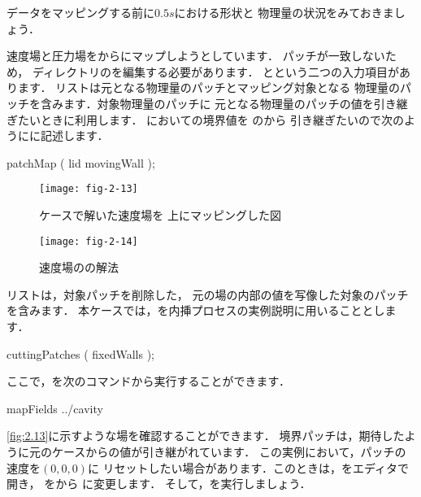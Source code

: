 データをマッピングする前に$0.5\unit{s}$における形状と
物理量の状況をみておきましょう．

速度場と圧力場をからにマップしようとしています．
パッチが一致しないため，
ディレクトリのを編集する必要があります．
とという二つの入力項目があります．
リストは元となる物理量のパッチとマッピング対象となる
物理量のパッチを含みます．対象物理量のパッチに
元となる物理量のパッチの値を引き継ぎたいときに利用します．
においての境界値を
のから
引き継ぎたいので次のようにに記述します．
\begin{OFverbatim}[file]
patchMap
(
   lid movingWall
);
\end{OFverbatim}


\begin{figure}[ht]
 \texttt{[image: fig-2-13]}
 \caption{ケースで解いた速度場を
 上にマッピングした図}
 \label{fig:2.13}
\end{figure}


\begin{figure}[ht]
 \texttt{[image: fig-2-14]}
 \caption{速度場のの解法}
 \label{fig:2.14}
\end{figure}


リストは，対象パッチを削除した，
元の場の内部の値を写像した対象のパッチを含みます．
本ケースでは，を内挿プロセスの実例説明に用いることとします．
\begin{OFverbatim}[file]
cuttingPatches
(
  fixedWalls
);
\end{OFverbatim}
ここで，を次のコマンドから実行することができます．
\begin{OFverbatim}[terminal]
mapFields ../cavity
\end{OFverbatim}
\autoref{fig:2.13}に示すような場を確認することができます．
境界パッチは，期待したように元のケースからの値が引き継がれています．
この実例において，パッチの速度を$(0, 0, 0)$に
リセットしたい場合があります．このときは，をエディタで開き，
をから
に変更します．
そして，を実行しましょう．


